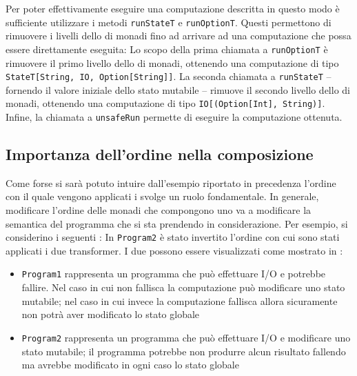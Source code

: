Per poter effettivamente eseguire una computazione descritta in questo modo è sufficiente utilizzare i metodi \lstinline{runStateT} e \lstinline{runOptionT}. Questi permettono di rimuovere i livelli dello  di monadi fino ad arrivare ad una computazione che possa essere direttamente eseguita:
Lo scopo della prima chiamata a \lstinline{runOptionT} è rimuovere il primo livello dello  di monadi, ottenendo una computazione di tipo \lstinline{StateT[String, IO, Option[String]]}. La seconda chiamata a \lstinline{runStateT} -- fornendo il valore iniziale dello stato mutabile -- rimuove il secondo livello dello  di monadi, ottenendo una computazione di tipo \lstinline{IO[(Option[Int], String)]}. Infine, la chiamata a \lstinline{unsafeRun} permette di eseguire la computazione ottenuta.

\subsection{Importanza dell'ordine nella composizione}
Come forse si sarà potuto intuire dall'esempio riportato in precedenza l'ordine con il quale vengono applicati i  svolge un ruolo fondamentale. In generale, modificare l'ordine delle monadi che compongono uno  va a modificare la semantica del programma che si sta prendendo in considerazione. Per esempio, si considerino i seguenti :
In \lstinline{Program2} è stato invertito l'ordine con cui sono stati applicati i due transformer. I due  possono essere visualizzati come mostrato in :
\begin{itemize}
  \item \lstinline{Program1} rappresenta un programma che può effettuare I/O e potrebbe fallire. Nel caso in cui non fallisca la computazione può modificare uno stato mutabile; nel caso in cui invece la computazione fallisca allora sicuramente non potrà aver modificato lo stato globale
  \item \lstinline{Program2} rappresenta un programma che può effettuare I/O e modificare uno stato mutabile; il programma potrebbe non produrre alcun risultato fallendo ma avrebbe modificato in ogni caso lo stato globale
\end{itemize}



